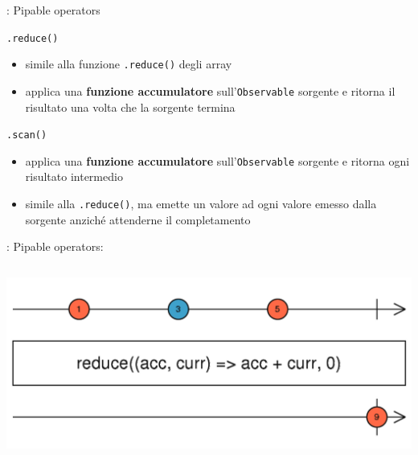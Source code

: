             \begin{frame}{\insertsubsectionhead}{: Pipable operators}
                \begin{block}{\texttt{.reduce()}}
                    \begin{itemize}
                        \item
                            simile alla funzione \texttt{.reduce()} degli array
                        \item
                            applica una \textbf{funzione accumulatore} sull'\texttt{Observable} sorgente e ritorna il risultato una volta che la sorgente termina
                    \end{itemize}
                \end{block}

                \pause

                \begin{block}{\texttt{.scan()}}
                    \begin{itemize}
                        \item
                            applica una \textbf{funzione accumulatore} sull'\texttt{Observable} sorgente e ritorna ogni risultato intermedio
                        \item
                            simile alla \texttt{.reduce()}, ma emette un valore ad ogni valore emesso dalla sorgente anziché attenderne il completamento
                    \end{itemize}
                \end{block}

            \end{frame}

            \begin{frame}[fragile]{\insertsubsectionhead}{: Pipable operators: \texttt{\insertsubsubsectionhead}}
                \inputminted{js}{src/reduce.js}
                \includegraphics[width=\linewidth]{reduce}
            \end{frame}

